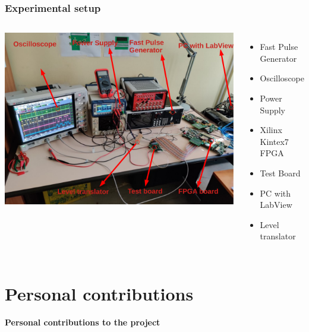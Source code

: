 \documentclass[aspectratio=169]{beamer}
\begin{document}
	\begin{frame}
	\frametitle{Experimental setup}
		\begin{columns}
			\begin{center}
				\includegraphics[width=0.95 \textwidth]{IMG/TestBench.pdf}
			\end{center}
			\begin{itemize}
				\item Fast Pulse Generator
				\item Oscilloscope
				\item Power Supply
				\item Xilinx Kintex7 FPGA
				\item Test Board
				\item PC with LabView
				\item Level translator
			\end{itemize}
		\end{columns}
		
	\end{frame}



	\section{Personal contributions}
	
	\begin{frame}
		\begin{center}
			{\Huge {}\selectfont \color{blue} \textbf{Personal contributions to the project}}
		\end{center}
	\end{frame}
	
\end{document}
